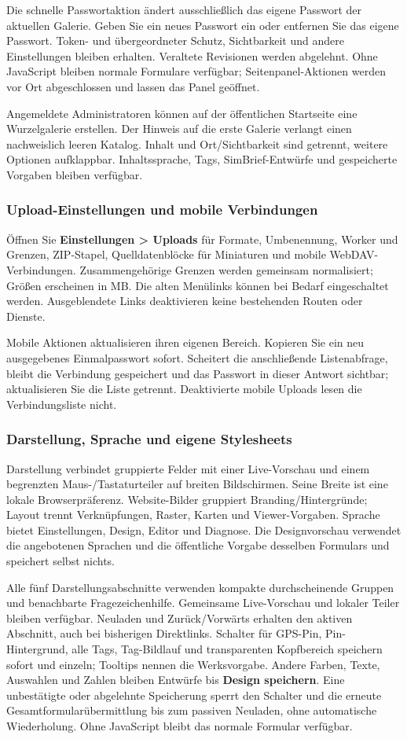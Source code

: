 \documentclass[11pt,a4paper]{article}
\newcommand{\ui}[1]{\textbf{#1}}
\begin{document}
Die schnelle Passwortaktion ändert ausschließlich das eigene Passwort der
aktuellen Galerie. Geben Sie ein neues Passwort ein oder entfernen Sie das
eigene Passwort. Token- und übergeordneter Schutz, Sichtbarkeit und andere
Einstellungen bleiben erhalten. Veraltete Revisionen werden abgelehnt. Ohne
JavaScript bleiben normale Formulare verfügbar; Seitenpanel-Aktionen werden vor
Ort abgeschlossen und lassen das Panel geöffnet.

Angemeldete Administratoren können auf der öffentlichen Startseite eine
Wurzelgalerie erstellen. Der Hinweis auf die erste Galerie verlangt einen
nachweislich leeren Katalog. Inhalt und Ort/Sichtbarkeit sind getrennt, weitere
Optionen aufklappbar. Inhaltssprache, Tags, SimBrief-Entwürfe und gespeicherte
Vorgaben bleiben verfügbar.

\subsubsection{Upload-Einstellungen und mobile Verbindungen}
Öffnen Sie \ui{Einstellungen > Uploads} für Formate, Umbenennung, Worker und
Grenzen, ZIP-Stapel, Quelldatenblöcke für Miniaturen und mobile
WebDAV-Verbindungen. Zusammengehörige Grenzen werden gemeinsam normalisiert;
Größen erscheinen in MB. Die alten Menülinks können bei Bedarf eingeschaltet
werden. Ausgeblendete Links deaktivieren keine bestehenden Routen oder Dienste.

Mobile Aktionen aktualisieren ihren eigenen Bereich. Kopieren Sie ein neu
ausgegebenes Einmalpasswort sofort. Scheitert die anschließende Listenabfrage,
bleibt die Verbindung gespeichert und das Passwort in dieser Antwort sichtbar;
aktualisieren Sie die Liste getrennt. Deaktivierte mobile Uploads lesen die
Verbindungsliste nicht.

\subsubsection{Darstellung, Sprache und eigene Stylesheets}
Darstellung verbindet gruppierte Felder mit einer Live-Vorschau und einem
begrenzten Maus-/Tastaturteiler auf breiten Bildschirmen. Seine Breite ist eine
lokale Browserpräferenz. Website-Bilder gruppiert Branding/Hintergründe; Layout
trennt Verknüpfungen, Raster, Karten und Viewer-Vorgaben. Sprache bietet
Einstellungen, Design, Editor und Diagnose. Die Designvorschau verwendet die
angebotenen Sprachen und die öffentliche Vorgabe desselben Formulars und
speichert selbst nichts.

Alle fünf Darstellungsabschnitte verwenden kompakte durchscheinende Gruppen
und benachbarte Fragezeichenhilfe. Gemeinsame Live-Vorschau und lokaler Teiler
bleiben verfügbar. Neuladen und Zurück/Vorwärts erhalten den aktiven Abschnitt,
auch bei bisherigen Direktlinks. Schalter für GPS-Pin, Pin-Hintergrund, alle
Tags, Tag-Bildlauf und transparenten Kopfbereich speichern sofort und einzeln;
Tooltips nennen die Werksvorgabe. Andere Farben, Texte, Auswahlen und Zahlen
bleiben Entwürfe bis \ui{Design speichern}. Eine unbestätigte oder abgelehnte
Speicherung sperrt den Schalter und die erneute Gesamtformularübermittlung bis
zum passiven Neuladen, ohne automatische Wiederholung. Ohne JavaScript bleibt
das normale Formular verfügbar.
\end{document}
